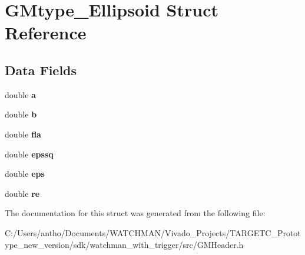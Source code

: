 \section{G\+Mtype\+\_\+\+Ellipsoid Struct Reference}
\label{struct_g_mtype___ellipsoid}
\subsection*{Data Fields}
\begin{DoxyCompactItemize}
\item 
\mbox{\label{struct_g_mtype___ellipsoid_a1031d0e0a97a340abfe0a6ab9e831045}} 
double {\bfseries a}
\item 
\mbox{\label{struct_g_mtype___ellipsoid_a1510a66dacf9cf3586de5fc89ae2a073}} 
double {\bfseries b}
\item 
\mbox{\label{struct_g_mtype___ellipsoid_a50306210781b3f4f0ec6d005823310d5}} 
double {\bfseries fla}
\item 
\mbox{\label{struct_g_mtype___ellipsoid_ae609c1cf175e3601d59f31dd63ecfe3f}} 
double {\bfseries epssq}
\item 
\mbox{\label{struct_g_mtype___ellipsoid_a974b448c3d0a13d483d36ef15de369b5}} 
double {\bfseries eps}
\item 
\mbox{\label{struct_g_mtype___ellipsoid_a5a6fce2fc5cae153945fea2c45beeb4f}} 
double {\bfseries re}
\end{DoxyCompactItemize}


The documentation for this struct was generated from the following file\+:\begin{DoxyCompactItemize}
\item 
C\+:/\+Users/antho/\+Documents/\+W\+A\+T\+C\+H\+M\+A\+N/\+Vivado\+\_\+\+Projects/\+T\+A\+R\+G\+E\+T\+C\+\_\+\+Prototype\+\_\+new\+\_\+version/sdk/watchman\+\_\+with\+\_\+trigger/src/G\+M\+Header.\+h\end{DoxyCompactItemize}
